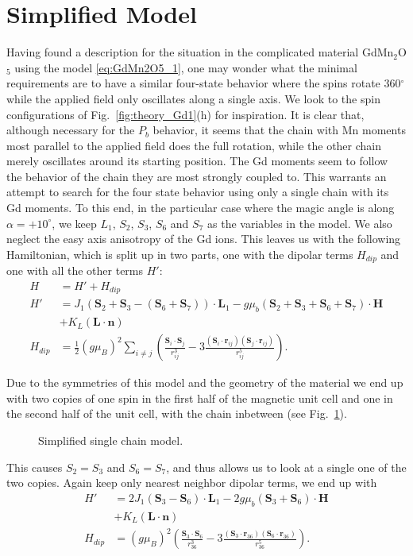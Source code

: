 \section{Simplified Model}
Having found a description for the situation in the complicated material GdMn$_2$O$_5$ using the model \ref{eq:GdMn2O5_1}, one may wonder what the minimal requirements are to have a similar four-state behavior where the spins rotate 360$^\circ$ while the applied field only oscillates along a single axis.
We look to the spin configurations of Fig.~\ref{fig:theory_Gd1}(h) for inspiration. It is clear that, although necessary for the $P_b$ behavior, it seems that the chain with Mn moments most parallel to the applied field does the full rotation, while the other chain merely oscillates around its starting position. The Gd moments seem to follow the behavior of the chain they are most strongly coupled to. This warrants an attempt to search for the four state behavior using only a single chain with its Gd moments.   
To this end, in the particular case where the magic angle is along $\alpha = +10^\circ$, we keep $L_1$, $S_2$, $S_3$, $S_6$ and $S_7$ as the variables in the model.
We also neglect the easy axis anisotropy of the Gd ions.
This leaves us with the following Hamiltonian, which is split up in two parts, one with the dipolar terms $H_{dip}$ and one with all the other terms $H'$:
\begin{align}
	H &= H' + H_{dip} \\
	H' &= J_1(\mathbf{S}_2 + \mathbf{S}_3 - (\mathbf{S}_6 + \mathbf{S}_7))\cdot\mathbf{L}_1 - g \mu_b (\mathbf{S}_2 + \mathbf{S}_3 + \mathbf{S}_6 + \mathbf{S}_7) \cdot \mathbf{H} \\
	&+ K_L (\mathbf{L} \cdot \mathbf{n}) \\
	H_{dip} &= \frac{1}{2}(g \mu_B)^2\sum_{i\neq j}\left(\frac{\mathbf{S}_i\cdot \mathbf{S}_j}{r_{ij}^3}-3\frac{(\mathbf{S}_i\cdot \mathbf{r}_{ij})(\mathbf{S}_j\cdot \mathbf{r}_{ij})}{r_{ij}^5}\right).
\end{align}

Due to the symmetries of this model and the geometry of the material we end up with two copies of one spin in the first half of the magnetic unit cell and one in the second half of the unit cell, with the chain inbetween (see Fig.~\ref{fig:GdMn2O5_simple_model}).
\begin{figure}
	\caption{\label{fig:GdMn2O5_simple_model} Simplified single chain model.}
\end{figure}

This causes $S_2 = S_3$ and $S_6 = S_7$, and thus allows us to look at a single one of the two copies. Again keep only nearest neighbor dipolar terms, we end up with
\begin{align}
	H' &= 2J_1(\mathbf{S}_3 - \mathbf{S}_6)\cdot\mathbf{L}_1 - 2g \mu_b (\mathbf{S}_3 + \mathbf{S}_6) \cdot \mathbf{H} \\
	&+ K_L (\mathbf{L} \cdot \mathbf{n}) \\
	H_{dip} &= (g \mu_B)^2\left(\frac{\mathbf{S}_3\cdot \mathbf{S}_6}{r_{36}^3}-3\frac{(\mathbf{S}_3\cdot \mathbf{r}_{36})(\mathbf{S}_6\cdot \mathbf{r}_{36})}{r_{36}^5}\right).
\end{align}

\printbibliography
